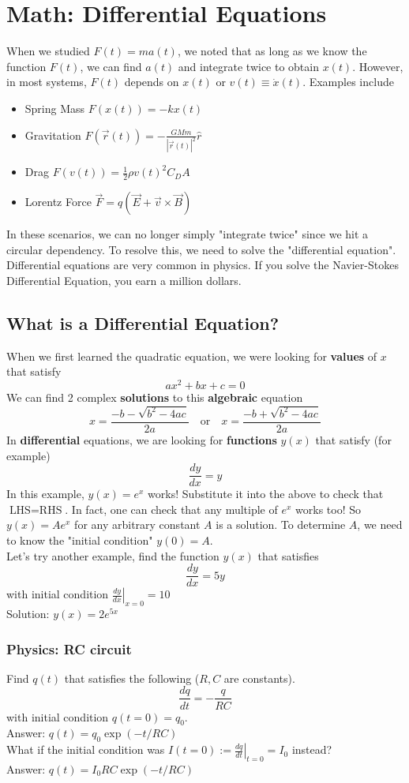 \documentclass{article}
\begin{document}
\section{Math: Differential Equations}
When we studied $F(t)=ma(t)$, we noted that as long as we know the function $F(t)$, we can find $a(t)$ and integrate twice to obtain $x(t)$. However, in most systems, $F(t)$ depends on $x(t)$ or $v(t) \equiv \dot{x}(t)$. Examples include 
\begin{itemize}
    \item Spring Mass $F(x(t)) = -kx(t)$
    \item Gravitation $F(\vec{r}(t)) = -\frac{GMm}{|\vec{r}(t)|^2} \hat{r}$
    \item Drag $F(v(t)) = \frac{1}{2} \rho v(t)^2 C_D A$
    \item Lorentz Force $\vec{F} = q(\vec{E} + \vec{v} \times \vec{B})$
\end{itemize}
In these scenarios, we can no longer simply "integrate twice" since we hit a circular dependency. To resolve this, we need to solve the "differential equation". Differential equations are very common in physics. If you solve the Navier-Stokes Differential Equation, you earn a million dollars.

\subsection{What is a Differential Equation?}
When we first learned the quadratic equation, we were looking for \textbf{values} of $x$ that satisfy $$ax^2 + bx + c = 0$$  We can find 2 complex \textbf{solutions} to this \textbf{algebraic} equation
$$x = \frac{-b - \sqrt{b^2 - 4ac}}{2a} \quad \text{or}\quad x = \frac{-b + \sqrt{b^2 - 4ac}}{2a}$$
In \textbf{differential} equations, we are looking for \textbf{functions} $y(x)$ that satisfy (for example)
$$\frac{dy}{dx} = y$$
In this example, $y(x) = e^x$ works! Substitute it into the above to check that $\text{LHS} = \text{RHS}$. In fact, one can check that any multiple of $e^x$ works too! So $y(x) = A e^x$ for any arbitrary constant $A$ is a solution. To determine $A$, we need to know the "initial condition" $y(0) = A$.
\\[10pt]
Let's try another example, find the function $y(x)$ that satisfies 
$$\frac{dy}{dx} = 5y$$ with initial condition $\left. \frac{dy}{dx} \right|_{x=0} = 10$\\
Solution: $y(x) = 2e^{5x}$
\subsubsection{Physics: RC circuit} 
Find $q(t)$ that satisfies the following ($R,C$ are constants).
$$\frac{dq}{dt} = -\frac{q}{RC}$$ with initial condition $q(t=0) = q_0$. \\Answer: $q(t) = q_0 \exp (-t/RC)$ \\[10pt]
What if the initial condition was $I(t=0) := \left. \frac{dq}{dt} \right|_{t=0} = I_0$ instead? \\ Answer: $q(t) = {I_0 RC} \exp (-t/RC)$\\[10pt]
\end{document}
